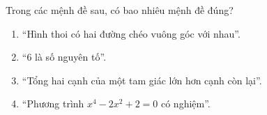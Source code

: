 \begin{ex}
Trong các mệnh đề sau, có bao nhiêu mệnh đề đúng?
\begin{enumerate}[label=\alph*)]
\item ``Hình thoi có hai đường chéo vuông góc với nhau''.
\item ``$6$ là số nguyên tố''.
\item ``Tổng hai cạnh của một tam giác lớn hơn cạnh còn lại''.
\item ``Phương trình $x^4-2x^2+2=0$ có nghiệm''.
\end{enumerate}
\end{ex}
